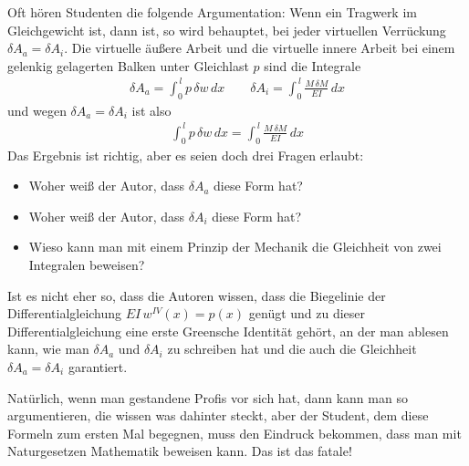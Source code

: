 Oft h\"{o}ren Studenten die folgende Argumentation: Wenn ein Tragwerk im Gleichgewicht ist, dann ist, so wird behauptet, bei jeder virtuellen Verr\"{u}ckung $\delta A_a = \delta A_i$. Die virtuelle \"{a}u{\ss}ere Arbeit und die virtuelle innere Arbeit bei einem gelenkig gelagerten Balken unter Gleichlast $p$ sind die Integrale
\begin{align}
\delta A_a = \int_0^{\,l} p\,\delta w\,dx \qquad \delta A_i = \int_0^{\,l} \frac{M\,\delta M}{EI}\,dx
\end{align}
und wegen $\delta A_a = \delta A_i$ ist also
\begin{align}
\int_0^{\,l} p\,\delta w\,dx = \int_0^{\,l} \frac{M\,\delta M}{EI}\,dx
\end{align}
Das Ergebnis ist richtig, aber es seien doch drei Fragen erlaubt:
\begin{itemize}
  \item Woher wei{\ss} der Autor, dass $\delta A_a$ diese Form hat?
  \item Woher wei{\ss} der Autor, dass $\delta A_i$ diese Form hat?
  \item Wieso kann man mit einem Prinzip der Mechanik die Gleichheit von zwei Integralen beweisen?
\end{itemize}
Ist es nicht eher so, dass die Autoren wissen, dass die Biegelinie der Differentialgleichung $EI\,w^{IV}(x) = p(x)$ gen\"{u}gt und zu dieser Differentialgleichung eine erste Greensche Identit\"{a}t geh\"{o}rt, an der man ablesen kann, wie man $\delta A_a$ und $\delta A_i$ zu schreiben hat und die auch die Gleichheit $\delta A_a = \delta A_i$ garantiert.

Nat\"{u}rlich, wenn man gestandene Profis vor sich hat, dann kann man so argumentieren, die wissen was dahinter steckt, aber der Student, dem diese Formeln zum ersten Mal begegnen, muss den Eindruck bekommen, dass man mit Naturgesetzen Mathematik beweisen kann. Das ist das fatale!

